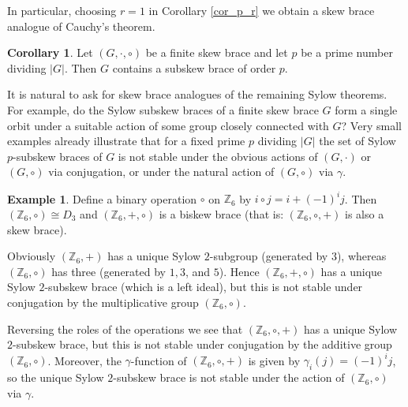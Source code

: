 \documentclass[12pt,a4paper, reqno]{amsart}
\theoremstyle{definition}
\newtheorem{corollary}[theorem]{Corollary}
\newtheorem{example}[theorem]{Example}
\newcommand{\Z}{\mathbb{Z}}
\DeclareMathOperator{\Aut}{\mbox{Aut}}
\DeclareMathOperator{\Fix}{\mbox{Fix}}
\begin{document}
In particular, choosing $ r=1 $ in Corollary \ref{cor_p_r} we obtain a skew brace analogue of Cauchy's theorem. 

\begin{corollary} \label{cor_Cauchy}
Let $ (G,\cdot,\circ) $ be a finite skew brace and let $ p $ be a prime number dividing $ |G| $. Then $ G $ contains a subskew brace of order $ p $. 
\end{corollary}

It is natural to ask for skew brace analogues of the remaining Sylow theorems. For example, do the Sylow subskew braces of a finite skew brace $ G $ form a single orbit under a suitable action of some group closely connected with $ G $?  Very small examples already illustrate that for a fixed prime $ p $ dividing $ |G| $ the set of Sylow $ p $-subskew braces of $ G $ is not stable under the obvious actions of $ (G,\cdot) $ or $ (G,\circ) $ via conjugation, or under the natural action of $ (G,\circ) $ via $ \gamma $. 

\begin{example} \label{eg_Z_6_counterexamples}
Define a binary operation $ \circ $ on $ \Z_{6} $ by $ i \circ j = i+(-1)^{i}j $. Then $ (\Z_{6},\circ) \cong D_{3} $ and $ (\Z_{6},+,\circ) $ is a biskew brace (that is: $ (\Z_{6},\circ,+) $ is also a skew brace). 

Obviously $ (\Z_{6},+) $ has a unique Sylow $ 2 $-subgroup (generated by $ 3 $), whereas $ (\Z_{6},\circ) $ has three (generated by $ 1,3 $, and $ 5 $). Hence $ (\Z_{6},+,\circ) $ has a unique Sylow $ 2 $-subskew brace (which is a left ideal), but this is not stable under conjugation by the multiplicative group $ (\Z_{6},\circ) $. 

Reversing the roles of the operations we see that $ (\Z_{6},\circ,+) $ has a unique Sylow $ 2 $-subskew brace, but this is not stable under conjugation by the additive group $ (\Z_{6},\circ) $. Moreover, the $ \gamma $-function of $ (\Z_{6},\circ,+) $ is given by $ \gamma_{i}(j) = (-1)^{i}j $, so the unique Sylow $ 2 $-subskew brace is not stable under the action of $ (\Z_{6},\circ) $ via $ \gamma $. 
\end{example}
\end{document}
